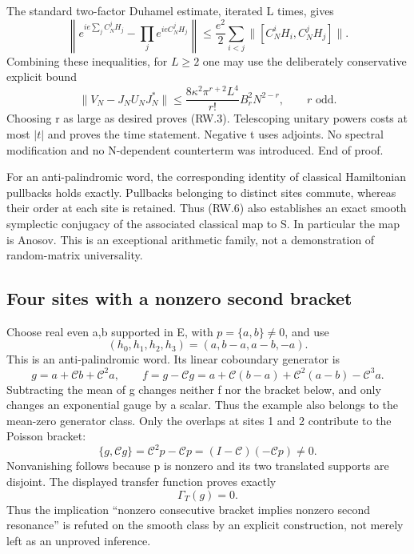 The standard two-factor Duhamel estimate, iterated L times, gives \[
 \left\|e^{ie\sum_j C_N^jH_j}-\prod_j e^{ieC_N^jH_j}\right\|
       \leq\frac{e^2}{2}\sum_{i<j}\|[C_N^iH_i,C_N^jH_j]\|.
\] Combining these inequalities, for \(L\geq2\) one may use the deliberately conservative explicit bound \[
 \boxed{\displaystyle
 \|V_N-J_NU_NJ_N^*\|
 \leq\frac{8\kappa^2\pi^{r+2}L^4}{r!}
                      B_r^2 N^{2-r},\qquad r\text{ odd}.}   \tag{RW.7}
\] Choosing r as large as desired proves (RW.3). Telescoping unitary powers costs at most \(|t|\) and proves the time statement. Negative t uses adjoints. No spectral modification and no N-dependent counterterm was introduced. End of proof.

For an anti-palindromic word, the corresponding identity of classical Hamiltonian pullbacks holds exactly. Pullbacks belonging to distinct sites commute, whereas their order at each site is retained. Thus (RW.6) also establishes an exact smooth symplectic conjugacy of the associated classical map to S. In particular the map is Anosov. This is an exceptional arithmetic family, not a demonstration of random-matrix universality.

\subsection{Four sites with a nonzero second bracket}\label{return_words:four-sites-with-a-nonzero-second-bracket}

Choose real even a,b supported in E, with \(p=\{a,b\}\ne0\), and use \[
 (h_0,h_1,h_2,h_3)=(a,b-a,a-b,-a).
\] This is an anti-palindromic word. Its linear coboundary generator is \[
 g=a+\mathcal Cb+\mathcal C^2a,\qquad
 f=g-\mathcal Cg
   =a+\mathcal C(b-a)+\mathcal C^2(a-b)-\mathcal C^3a.        \tag{RW.8}
\] Subtracting the mean of g changes neither f nor the bracket below, and only changes an exponential gauge by a scalar. Thus the example also belongs to the mean-zero generator class. Only the overlaps at sites 1 and 2 contribute to the Poisson bracket: \[
 \boxed{\displaystyle
 \{g,\mathcal Cg\}=\mathcal C^2p-\mathcal Cp
          =(I-\mathcal C)(-\mathcal Cp)\ne0.}               \tag{RW.9}
\] Nonvanishing follows because p is nonzero and its two translated supports are disjoint. The displayed transfer function proves exactly \[
                  \Gamma_T(g)=0.                           \tag{RW.10}
\] Thus the implication ``nonzero consecutive bracket implies nonzero second resonance'' is refuted on the smooth class by an explicit construction, not merely left as an unproved inference.

